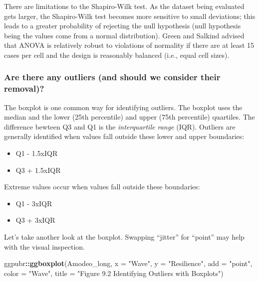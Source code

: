 \documentclass[
  11pt,
]{book}
\newenvironment{Shaded}{\begin{snugshade}}{\end{snugshade}}
\newcommand{\AttributeTok}[1]{\textcolor[rgb]{0.27,0.27,0.27}{#1}}
\newcommand{\FunctionTok}[1]{\textcolor[rgb]{0.27,0.27,0.27}{\textbf{#1}}}
\newcommand{\NormalTok}[1]{#1}
\newcommand{\SpecialCharTok}[1]{\textcolor[rgb]{0.43,0.43,0.43}{\textbf{#1}}}
\newcommand{\StringTok}[1]{\textcolor[rgb]{0.5,0.5,0.5}{#1}}
\providecommand{\tightlist}{%
  \setlength{\itemsep}{0pt}\setlength{\parskip}{0pt}}
\begin{document}
There are limitations to the Shapiro-Wilk test. As the dataset being evaluated gets larger, the Shapiro-Wilk test becomes more sensitive to small deviations; this leads to a greater probability of rejecting the null hypothesis (null hypothesis being the values come from a normal distribution). Green and Salkind \citeyearpar{green_using_2017} advised that ANOVA is relatively robust to violations of normality if there are at least 15 cases per cell and the design is reasonably balanced (i.e., equal cell sizes).

\hypertarget{are-there-any-outliers-and-should-we-consider-their-removal}{%
\subsubsection{Are there any outliers (and should we consider their removal)?}\label{are-there-any-outliers-and-should-we-consider-their-removal}}

The boxplot is one common way for identifying outliers. The boxplot uses the median and the lower (25th percentile) and upper (75th percentile) quartiles. The difference bewteen Q3 and Q1 is the \emph{interquartile range} (IQR). Outliers are generally identified when values fall outside these lower and upper boundaries:

\begin{itemize}
\tightlist
\item
  Q1 - 1.5xIQR
\item
  Q3 + 1.5xIQR
\end{itemize}

Extreme values occur when values fall outside these boundaries:

\begin{itemize}
\tightlist
\item
  Q1 - 3xIQR
\item
  Q3 + 3xIQR
\end{itemize}

Let's take another look at the boxplot. Swapping ``jitter'' for ``point'' may help with the visual inspection.

\begin{Shaded}
\begin{Highlighting}[]
\NormalTok{ggpubr}\SpecialCharTok{::}\FunctionTok{ggboxplot}\NormalTok{(Amodeo\_long, }\AttributeTok{x =} \StringTok{"Wave"}\NormalTok{, }\AttributeTok{y =} \StringTok{"Resilience"}\NormalTok{, }\AttributeTok{add =} \StringTok{"point"}\NormalTok{,}
    \AttributeTok{color =} \StringTok{"Wave"}\NormalTok{, }\AttributeTok{title =} \StringTok{"Figure 9.2 Identifying Outliers with Boxplots"}\NormalTok{)}
\end{Highlighting}
\end{Shaded}
\end{document}

